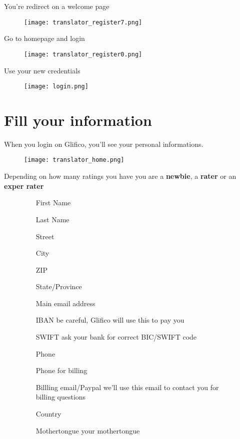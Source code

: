 \documentclass[11 pt, a4paper]{article}
\begin{document}
You're redirect on a welcome page
\begin{figure}[H]
\centering
\texttt{[image: translator\_register7.png]}
\end{figure}

\clearpage
Go to homepage and login
\begin{figure}[H]
\centering
\texttt{[image: translator\_register0.png]}
\end{figure}

Use your new credentials
\begin{figure}[H]
\centering
\texttt{[image: login.png]}
\end{figure}

\clearpage
\section{Fill your information}
When you login on Glifico, you'll see your personal informations.
\begin{figure}[H]
\centering
\texttt{[image: translator\_home.png]}
\end{figure}

Depending on how many ratings you have you are a \textbf{newbie}, a \textbf{rater} or an \textbf{exper rater}

\begin{figure}[H]
\centering
\begin{minipage}{0.8\linewidth}
\begin{itemize}
\item[First Name]
\item[Last Name]
\item[Street]
\item[City]
\item[ZIP]
\item[State/Province]
\item[Main email address]
\item[IBAN] be careful, Glifico will use this to pay you
\item[SWIFT] ask your bank for correct BIC/SWIFT code
\item[Phone]
\item[Phone for billing]
\item[Billling email/Paypal] we'll use this email to contact you for billing questions
\item[Country]
\item[Mothertongue] your mothertongue
\end{itemize}
\end{minipage}
\end{figure}
\end{document}

